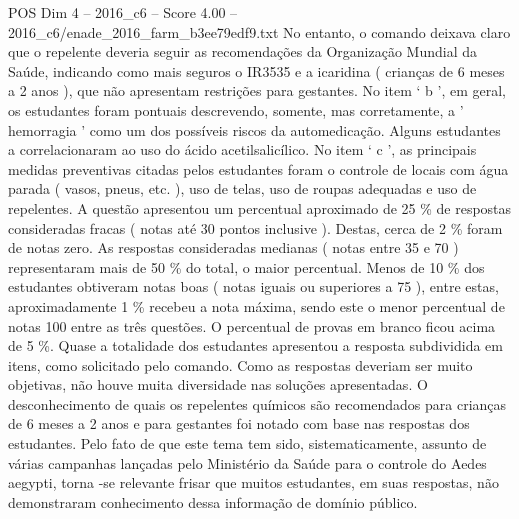 \begin{textsample}{POS Dim 4 – 2016\_c6 – Score 4.00 – 2016\_c6/enade\_2016\_farm\_b3ee79edf9.txt}
No entanto, o comando deixava claro que o repelente deveria seguir as recomendações da Organização Mundial da Saúde, indicando como mais seguros o IR3535 e a icaridina ( crianças de 6 meses a 2 anos ), que não apresentam restrições para gestantes.
No item ‘ b ’, em geral, os estudantes foram pontuais descrevendo, somente, mas corretamente, a ' hemorragia ' como um dos possíveis riscos da automedicação.
Alguns estudantes a correlacionaram ao uso do ácido acetilsalicílico.
No item ‘ c ’, as principais medidas preventivas citadas pelos estudantes foram o controle de locais com água parada ( vasos, pneus, etc. ), uso de telas, uso de roupas adequadas e uso de repelentes.
A questão apresentou um percentual aproximado de 25 \% de respostas consideradas fracas ( notas até 30 pontos inclusive ).
Destas, cerca de 2 \% foram de notas zero.
As respostas consideradas medianas ( notas entre 35 e 70 ) representaram mais de 50 \% do total, o maior percentual.
Menos de 10 \% dos estudantes obtiveram notas boas ( notas iguais ou superiores a 75 ), entre estas, aproximadamente 1 \% recebeu a nota máxima, sendo este o menor percentual de notas 100 entre as três questões.
O percentual de provas em branco ficou acima de 5 \%.
Quase a totalidade dos estudantes apresentou a resposta subdividida em itens, como solicitado pelo comando.
Como as respostas deveriam ser muito objetivas, não houve muita diversidade nas soluções apresentadas.
O desconhecimento de quais os repelentes químicos são recomendados para crianças de 6 meses a 2 anos e para gestantes foi notado com base nas respostas dos estudantes.
Pelo fato de que este tema tem sido, sistematicamente, assunto de várias campanhas lançadas pelo Ministério da Saúde para o controle do Aedes aegypti, torna -se relevante frisar que muitos estudantes, em suas respostas, não demonstraram conhecimento dessa informação de domínio público.

\end{textsample}
